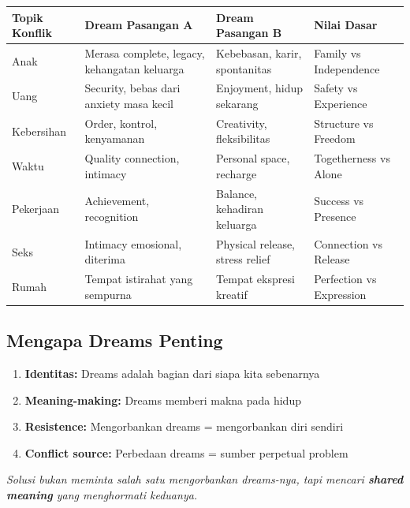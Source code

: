 \begin{center}
\renewcommand{\arraystretch}{1.5}
\begin{tabular}{|>{\raggedright}p{3cm}|>{\raggedright}p{4.5cm}|>{\raggedright}p{4.5cm}|>{\raggedright\arraybackslash}p{2.5cm}|}
\hline
\rowcolor{sagegreen!20}
\textbf{Topik Konflik} & \textbf{Dream Pasangan A} & \textbf{Dream Pasangan B} & \textbf{Nilai Dasar} \\
\hline
Anak & Merasa complete, legacy, kehangatan keluarga & Kebebasan, karir, spontanitas & Family vs Independence \\
\hline
Uang & Security, bebas dari anxiety masa kecil & Enjoyment, hidup sekarang & Safety vs Experience \\
\hline
Kebersihan & Order, kontrol, kenyamanan & Creativity, fleksibilitas & Structure vs Freedom \\
\hline
Waktu & Quality connection, intimacy & Personal space, recharge & Togetherness vs Alone \\
\hline
Pekerjaan & Achievement, recognition & Balance, kehadiran keluarga & Success vs Presence \\
\hline
Seks & Intimacy emosional, diterima & Physical release, stress relief & Connection vs Release \\
\hline
Rumah & Tempat istirahat yang sempurna & Tempat ekspresi kreatif & Perfection vs Expression \\
\hline
\end{tabular}
\end{center}

\subsection{Mengapa Dreams Penting}

\begin{praktikbox}
\begin{enumerate}
    \item \textbf{Identitas:} Dreams adalah bagian dari siapa kita sebenarnya
    \item \textbf{Meaning-making:} Dreams memberi makna pada hidup
    \item \textbf{Resistence:} Mengorbankan dreams = mengorbankan diri sendiri
    \item \textbf{Conflict source:} Perbedaan dreams = sumber perpetual problem
\end{enumerate}

\textit{Solusi bukan meminta salah satu mengorbankan dreams-nya, tapi mencari \textbf{shared meaning} yang menghormati keduanya.}
\end{praktikbox}

